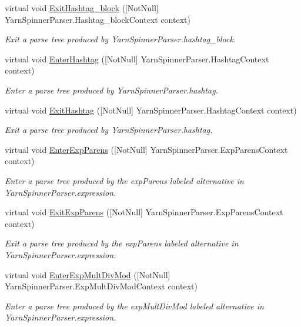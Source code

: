 \begin{DoxyCompactItemize}
virtual void \hyperlink{a00190_a7fec59b76bdec57fbc3dba0cf0977748}{Exit\-Hashtag\-\_\-block} (\mbox{[}Not\-Null\mbox{]} Yarn\-Spinner\-Parser.\-Hashtag\-\_\-block\-Context context)
\begin{DoxyCompactList}\small\item\em Exit a parse tree produced by Yarn\-Spinner\-Parser.\-hashtag\-\_\-block. \end{DoxyCompactList}\item 
virtual void \hyperlink{a00190_a0643d47b57d60c3d17fea2e1a883d63c}{Enter\-Hashtag} (\mbox{[}Not\-Null\mbox{]} Yarn\-Spinner\-Parser.\-Hashtag\-Context context)
\begin{DoxyCompactList}\small\item\em Enter a parse tree produced by Yarn\-Spinner\-Parser.\-hashtag. \end{DoxyCompactList}\item 
virtual void \hyperlink{a00190_a7eb067a011e0ba441779489495424912}{Exit\-Hashtag} (\mbox{[}Not\-Null\mbox{]} Yarn\-Spinner\-Parser.\-Hashtag\-Context context)
\begin{DoxyCompactList}\small\item\em Exit a parse tree produced by Yarn\-Spinner\-Parser.\-hashtag. \end{DoxyCompactList}\item 
virtual void \hyperlink{a00190_a550723908043bb1c5f6e85542710dd8f}{Enter\-Exp\-Parens} (\mbox{[}Not\-Null\mbox{]} Yarn\-Spinner\-Parser.\-Exp\-Parens\-Context context)
\begin{DoxyCompactList}\small\item\em Enter a parse tree produced by the {\ttfamily exp\-Parens} labeled alternative in Yarn\-Spinner\-Parser.\-expression. \end{DoxyCompactList}\item 
virtual void \hyperlink{a00190_a8e9b149b4b21ac11f38b77ca5eb39df3}{Exit\-Exp\-Parens} (\mbox{[}Not\-Null\mbox{]} Yarn\-Spinner\-Parser.\-Exp\-Parens\-Context context)
\begin{DoxyCompactList}\small\item\em Exit a parse tree produced by the {\ttfamily exp\-Parens} labeled alternative in Yarn\-Spinner\-Parser.\-expression. \end{DoxyCompactList}\item 
virtual void \hyperlink{a00190_a680b607d4481e92d0b601f2802d93584}{Enter\-Exp\-Mult\-Div\-Mod} (\mbox{[}Not\-Null\mbox{]} Yarn\-Spinner\-Parser.\-Exp\-Mult\-Div\-Mod\-Context context)
\begin{DoxyCompactList}\small\item\em Enter a parse tree produced by the {\ttfamily exp\-Mult\-Div\-Mod} labeled alternative in Yarn\-Spinner\-Parser.\-expression. \end{DoxyCompactList}\item 

\end{DoxyCompactItemize}
